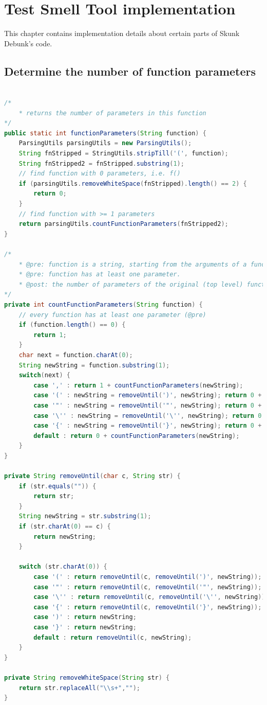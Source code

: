 \documentclass{uvamscse}
\newcommand{\toolName}{Skunk Debunk}
\begin{document}
\chapter{Test Smell Tool implementation}
\label{ap:code}
This chapter contains implementation details about certain parts of \toolName{'s} code.

\section{Determine the number of function parameters}
\label{ap:functionParamsAlgo}
\begin{lstlisting}[language=java, caption=Number of parameters algorithm, label=Code_parameterAlgorithm]

/*
	* returns the number of parameters in this function
*/
public static int functionParameters(String function) {
	ParsingUtils parsingUtils = new ParsingUtils();
	String fnStripped = StringUtils.stripTill('(', function);
	String fnStripped2 = fnStripped.substring(1);
	// find function with 0 parameters, i.e. f()
	if (parsingUtils.removeWhiteSpace(fnStripped).length() == 2) {
		return 0;
	}
	// find function with >= 1 parameters
	return parsingUtils.countFunctionParameters(fnStripped2);
}

/*
	* @pre: function is a string, starting from the arguments of a function, excluding the first parenthesis.
	* @pre: function has at least one parameter.
	* @post: the number of parameters of the original (top level) function.
*/
private int countFunctionParameters(String function) {
	// every function has at least one parameter (@pre)
	if (function.length() == 0) {
		return 1;
	} 
	char next = function.charAt(0);
	String newString = function.substring(1);
	switch(next) {
		case ',' : return 1 + countFunctionParameters(newString);
		case '(' : newString = removeUntil(')', newString); return 0 + countFunctionParameters(newString);
		case '"' : newString = removeUntil('"', newString); return 0 + countFunctionParameters(newString);
		case '\'' : newString = removeUntil('\'', newString); return 0 + countFunctionParameters(newString);
		case '{' : newString = removeUntil('}', newString); return 0 + countFunctionParameters(newString);
		default : return 0 + countFunctionParameters(newString);
	}
}

private String removeUntil(char c, String str) {
	if (str.equals("")) {
		return str;
	}
	String newString = str.substring(1);
	if (str.charAt(0) == c) {
		return newString;
	}

	switch (str.charAt(0)) {
		case '(' : return removeUntil(c, removeUntil(')', newString));
		case '"' : return removeUntil(c, removeUntil('"', newString));
		case '\'' : return removeUntil(c, removeUntil('\'', newString));
		case '{' : return removeUntil(c, removeUntil('}', newString));
		case ')' : return newString;
		case '}' : return newString;
		default : return removeUntil(c, newString);
	}
}

private String removeWhiteSpace(String str) {
	return str.replaceAll("\\s+","");
}

\end{lstlisting}
\end{document}
